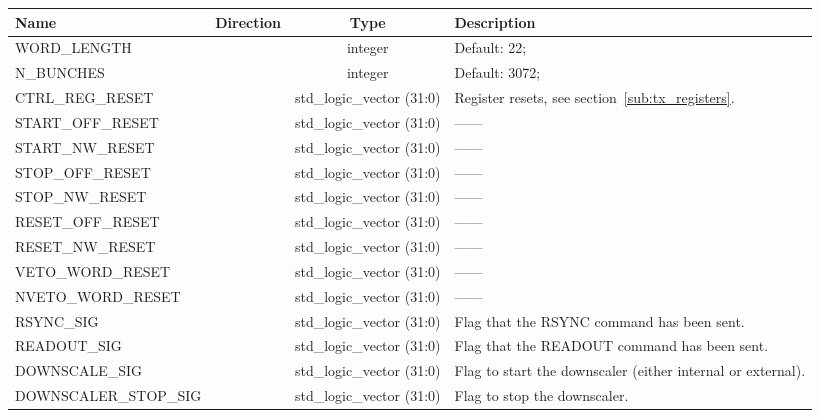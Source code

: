 \documentclass[]{article}
\newcommand*{\dittostraight}{---\textquotedbl---} %
\begin{document}
	\begin{table}
		\begin{center}
		\begin{tabulary}{\textwidth}{l | c | c | L}
			Name & Direction & Type & Description \\
			\hline
			WORD\_LENGTH          & & integer                   &  Default: 22;                                         \\
			N\_BUNCHES            & & integer                   &  Default: 3072;                                       \\
			CTRL\_REG\_RESET      & & std\_logic\_vector (31:0) &  Register resets, see section~\ref{sub:tx_registers}. \\
			START\_OFF\_RESET     & & std\_logic\_vector (31:0) &  \dittostraight                                       \\ 
			START\_NW\_RESET      & & std\_logic\_vector (31:0) &  \dittostraight                                       \\ 
			STOP\_OFF\_RESET      & & std\_logic\_vector (31:0) &  \dittostraight                                       \\ 
			STOP\_NW\_RESET       & & std\_logic\_vector (31:0) &  \dittostraight                                       \\ 
			RESET\_OFF\_RESET     & & std\_logic\_vector (31:0) &  \dittostraight                                       \\ 
			RESET\_NW\_RESET      & & std\_logic\_vector (31:0) &  \dittostraight                                       \\ 
			VETO\_WORD\_RESET     & & std\_logic\_vector (31:0) &  \dittostraight                                       \\ 
			NVETO\_WORD\_RESET    & & std\_logic\_vector (31:0) &  \dittostraight                                       \\ 
			RSYNC\_SIG            & & std\_logic\_vector (31:0) & Flag that the RSYNC command has been sent.                 \\
			READOUT\_SIG          & & std\_logic\_vector (31:0) & Flag that the READOUT command has been sent.               \\
			DOWNSCALE\_SIG        & & std\_logic\_vector (31:0) & Flag to start the downscaler (either internal or external).\\
			DOWNSCALER\_STOP\_SIG & & std\_logic\_vector (31:0) & Flag to stop the downscaler.                               \\

\end{tabulary}
\end{center}
\end{table}
\end{document}
